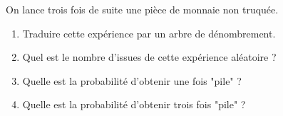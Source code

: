 
On lance trois fois de suite une pièce de monnaie non truquée.
\begin{enumerate}
\item Traduire cette expérience par un arbre de dénombrement.
\item Quel est le nombre d'issues de cette expérience aléatoire ?
\item Quelle est la probabilité d'obtenir une fois "pile" ?
\item Quelle est la probabilité d'obtenir trois fois "pile" ?
\end{enumerate}